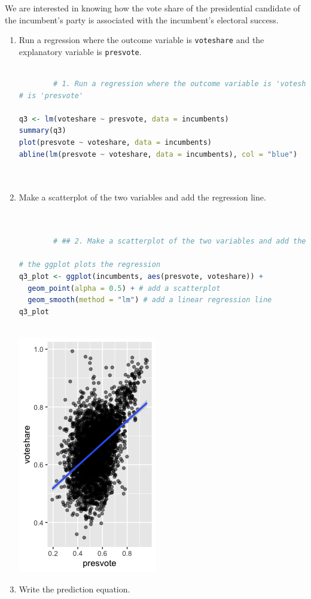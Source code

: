 \documentclass[12pt,letterpaper]{article}
\begin{document}
\noindent We are interested in knowing how the vote share of the presidential candidate of the incumbent's party is associated with the incumbent's electoral success.
	\vspace{.25cm}
	\begin{enumerate}
		\item Run a regression where the outcome variable is \texttt{voteshare} and the explanatory variable is \texttt{presvote}.
		
		
		\begin{lstlisting}[language=R]
		
		# 1. Run a regression where the outcome variable is 'voteshare' and the explanatory varaible'
# is 'presvote'

q3 <- lm(voteshare ~ presvote, data = incumbents)
summary(q3)
plot(presvote ~ voteshare, data = incumbents)
abline(lm(presvote ~ voteshare, data = incumbents), col = "blue")
		
		
		\end{lstlisting}
		
		
			\vspace{5cm}
		\item Make a scatterplot of the two variables and add the regression line. 
		
		
		\begin{lstlisting}[language=R]
		
		
		# ## 2. Make a scatterplot of the two variables and add the regression line

# the ggplot plots the regression
q3_plot <- ggplot(incumbents, aes(presvote, voteshare)) +
  geom_point(alpha = 0.5) + # add a scatterplot
  geom_smooth(method = "lm") # add a linear regression line
q3_plot
		
			\end{lstlisting}
			
			\includegraphics[scale=0.85]{plot_3.png}
		
			\vspace{5cm}
		\item Write the prediction equation.
	\end{enumerate}
	
\end{document}
